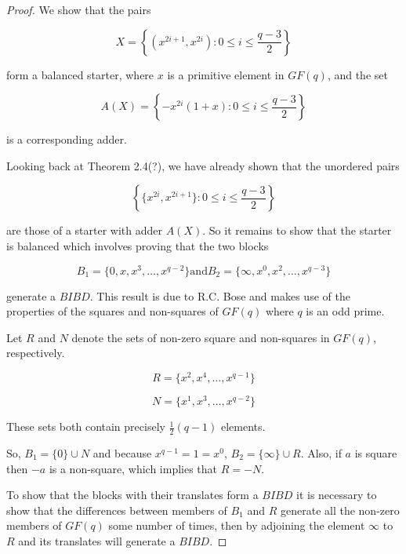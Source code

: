 \documentclass[
  11pt,
  a4paper]{book}
\begin{document}
\begin{proof}
We show that the pairs

\begin{equation}
X = \left\{(x^{2i + 1}, x^{2i}): 0 \leq i \leq \frac{q - 3}{2} \right\}
\end{equation}

form a balanced starter, where $x$ is a primitive element in
$GF(q)$, and the set

\begin{equation}
A(X) = \left\{-x^{2i}(1 + x): 0 \leq i \leq \frac{q - 3}{2} \right\}
\end{equation}

is a corresponding adder.

Looking back at Theorem 2.4(?), we have already shown that
the unordered pairs

\begin{equation}
\left\{\{x^{2i}, x^{2i + 1}\}: 0 \leq i \leq \frac{q - 3}{2} \right\}
\end{equation}

are those of a starter with adder $A(X)$. So it remains to
show that the starter is balanced which involves proving
that the two blocks

\begin{equation}
B_1 = \{0, x, x^3, \ldots, x^{q - 2}\} \mathrm{and} B_2 = \{\infty, x^0, x^2, \ldots, x^{q - 3}\}
\end{equation}

generate a $BIBD$. This result is due to R.C. Bose and makes
use of the properties of the squares and non-squares of
$GF(q)$ where $q$ is an odd prime.

Let $R$ and $N$ denote the sets of non-zero square and non-squares in
$GF(q)$, respectively.

\begin{equation}
R = \{x^2, x^4, \ldots, x^{q - 1}\}
\end{equation}

\begin{equation}
N = \{x^1, x^3, \ldots, x^{q - 2}\}
\end{equation}

These sets both contain precisely $\frac{1}{2}(q - 1)$
elements.

So, $B_1 = \{0\} \cup N$ and because $x^{q - 1} = 1 = x^0$,
$B_2 = \{\infty\} \cup R$. Also, if $a$ is square then $-a$
is a non-square, which implies that $R = -N$.

To show that the blocks with their translates form a $BIBD$
it is necessary to show that the differences between members
of $B_1$ and $R$ generate all the non-zero members of
$GF(q)$ some number of times, then by adjoining the element
$\infty$ to $R$ and its translates will generate a $BIBD$.


\end{proof}
\end{document}
